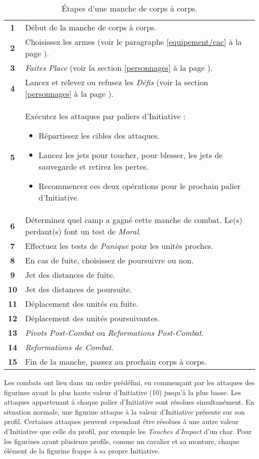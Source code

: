 \begin{table}[!htbp]
\centering
\begin{tabular}{c|m{12cm}}
\textbf{1} & Début de la manche de corps à corps. \tabularnewline
\textbf{2} & Choisissez les armes (voir le paragraphe \ref{equipement/cac} à la page \pageref{equipement/cac}). \tabularnewline
\textbf{3} & \emph{Faites Place} (voir la section \ref{personnages} à la page \pageref{personnages}). \tabularnewline
\textbf{4} & Lancez et relevez ou refusez les \emph{Défis} (voir la section \ref{personnages} à la page \pageref{personnages}). \tabularnewline
\vspace*{-0.4cm}
\textbf{5} & Exécutez les attaques par paliers d'Initiative :
	\begin{itemize}[label={-}, parsep=0cm,itemsep=0.05cm,topsep=0cm]
		\item Répartissez les cibles des attaques.
		\item Lancez les jets pour toucher, pour blesser, les jets de sauvegarde et retirez les pertes.
		\item Recommencez ces deux opérations pour le prochain palier d'Initiative.
 	\end{itemize}\tabularnewline
\textbf{6} & Déterminez quel camp a gagné cette manche de combat. Le(s) perdant(s) font un test de \emph{Moral}. \tabularnewline
\textbf{7} & Effectuez les tests de \emph{Panique} pour les unités proches. \tabularnewline
\textbf{8} & En cas de fuite, choisissez de poursuivre ou non. \tabularnewline
\textbf{9} & Jet des distances de fuite. \tabularnewline
\textbf{10} & Jet des distances de poursuite. \tabularnewline
\textbf{11} & Déplacement des unités en fuite. \tabularnewline
\textbf{12} & Déplacement des unités poursuivantes. \tabularnewline
\textbf{13} & \emph{Pivots Post-Combat} ou \emph{Reformations Post-Combat}. \tabularnewline
\textbf{14} & \emph{Reformations de Combat}. \tabularnewline
\textbf{15} & Fin de la manche, passez au prochain corps à corps. \tabularnewline
\end{tabular}
\caption{\label{table/etapes_manche_cac}Étapes d'une manche de corps à corps.}
\end{table}

Les combats ont lieu dans un ordre prédéfini, en commençant par les attaques des figurines ayant la plus haute valeur d'Initiative (10) jusqu'à la plus basse. Les attaques appartenant à chaque palier d'Initiative sont résolues simultanément. En situation normale, une figurine attaque à la valeur d'Initiative présente sur son profil. Certaines attaques peuvent cependant être résolues à une autre valeur d'Initiative que celle du profil, par exemple les \emph{Touches d'Impact} d'un char. Pour les figurines ayant plusieurs profils, comme un cavalier et sa monture, chaque élément de la figurine frappe à sa propre Initiative.

